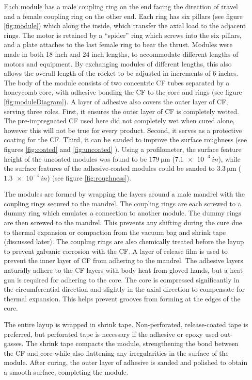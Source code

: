 \documentclass{aiaa-tc}%
\begin{document}
Each module has a male coupling ring on the end facing the direction of travel and a female coupling ring on the other end. 
Each ring has six pillars (see figure \ref{fig:module}) which along the inside, which transfer the axial load to the adjacent rings.
The motor is retained by a ``spider'' ring which screws into the six pillars, and a plate attaches to the last female ring to bear the thrust.
Modules were made in both 18 inch and 24 inch lengths, to accommodate different lengths of motors and equipment. 
By exchanging modules of different lengths, this also allows the overall length of the rocket to be adjusted in increments of 6 inches.
The body of the module consists of two concentric CF tubes separated by a honeycomb core, with adhesive bonding the CF to the core and rings (see figure \ref{fig:moduleDiagram}). 
A layer of adhesive also covers the outer layer of CF, serving three roles. First, it ensures the outer layer of CF is completely wetted. 
The pre-impregnated CF used here did not completely wet when cured alone, however this will not be true for every product.
Second, it serves as a protective coating for the CF. 
Third, it can be sanded to improve the surface roughness (see figures \ref{fig:coated} and \ref{fig:uncoated} ).
Using a profilometer, the surface feature height of the uncoated modules was found to be $\SI{179}{\micro\meter}$ ($\SI{7.1e-3}{in}$), while the surface features of the adhesive-coated modules could be sanded to $\SI{3.3}{\micro\meter}$ ($\SI{1.3e-4}{in}$) (see figure \ref{fig:roughness}).

The modules are formed by wrapping the layers around a male mandrel with the coupling rings secured to the mandrel.
The coupling rings are each screwed to a dummy ring which emulates a connection to another module. The dummy rings are then screwed to the mandrel.
This prevents any shifting during the cure due to thermal expansion or compaction from the vacuum bag and shrink tape (discussed later).
The coupling rings are also chemically treated before the layup to prevent galvanic corrosion with the CF.
A layer of release film is used to prevent the inner layer of CF from adhering to the mandrel. 
The adhesive layers naturally adhere to the CF layers with body heat from gloved hands, but a heat gun is required for adhering to the core. 
The core is compressed significantly in the circumferential direction and slightly in the axial direction to compensate for thermal expansion. This helps prevent grooves from forming at the edges of the core.

The entire layup is wrapped in shrink tape. Non-perforated, release-coated tape is preferred, but perforated tape is necessary if the adhesive or epoxy used out-gasses.
The shrink tape compacts the module, strengthening the bond between the CF and core while also flattening any irregularities in the surface of the module. 
After curing, the outer layer of adhesive is sanded and polished to obtain a smooth surface, completing the module. 
\end{document}
